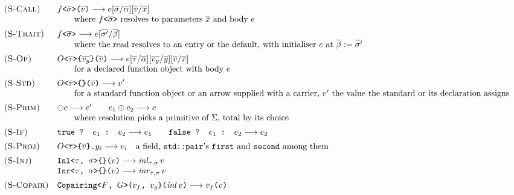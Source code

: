 \begin{figure}[htbp]
\[
\begin{array}{ll}
\textsc{(S-Call)} & f\texttt{<}\overline{\sigma}\texttt{>(}\overline{v}\texttt{)} \longrightarrow e[\overline{\sigma}/\overline{\alpha}][\overline{v}/\overline{x}] \\
 & \qquad \text{where } f\texttt{<}\overline{\sigma}\texttt{>} \text{ resolves to parameters } \overline{x} \text{ and body } e \\[5pt]
\textsc{(S-Trait)} & f\texttt{<}\overline{\sigma}\texttt{>} \longrightarrow e[\overline{\sigma'}/\overline{\beta}] \\
 & \qquad \text{where the read resolves to an entry or the default, with initialiser } e \text{ at } \overline{\beta} := \overline{\sigma'} \\[5pt]
\textsc{(S-Op)} & O\texttt{<}\overline{\tau}\texttt{>\{}\overline{v_y}\texttt{\}(}\overline{v}\texttt{)} \longrightarrow e[\overline{\tau}/\overline{\alpha}][\overline{v_y}/\overline{y}][\overline{v}/\overline{x}] \\
 & \qquad \text{for a declared function object with body } e \\[5pt]
\textsc{(S-Std)} & O\texttt{<}\overline{\tau}\texttt{>\{\}(}\overline{v}\texttt{)} \longrightarrow v' \\
 & \qquad \text{for a standard function object or an arrow supplied with a carrier, } v' \text{ the value the standard or its declaration assigns} \\[5pt]
\textsc{(S-Prim)} & \ominus c \longrightarrow c' \qquad c_1 \oplus c_2 \longrightarrow c \\
 & \qquad \text{where resolution picks a primitive of } \Sigma\text{, total by its choice} \\[5pt]
\textsc{(S-If)} & \texttt{true ? } e_1 \texttt{ : } e_2 \longrightarrow e_1 \qquad \texttt{false ? } e_1 \texttt{ : } e_2 \longrightarrow e_2 \\[5pt]
\textsc{(S-Proj)} & O\texttt{<}\overline{\tau}\texttt{>\{}\overline{v}\texttt{\}.}y_i \longrightarrow v_i \quad \text{a field, \texttt{std::pair}'s \texttt{first} and \texttt{second} among them} \\[5pt]
\textsc{(S-Inj)} & \texttt{Inl<}\tau\texttt{, }\sigma\texttt{>\{\}(}v\texttt{)} \longrightarrow \mathit{inl}_{\tau, \sigma}\,v \\
 & \texttt{Inr<}\tau\texttt{, }\sigma\texttt{>\{\}(}v\texttt{)} \longrightarrow \mathit{inr}_{\tau, \sigma}\,v \\[5pt]
\textsc{(S-Copair)} & \texttt{Copairing<}F\texttt{, }G\texttt{>\{}v_f\texttt{, }v_g\texttt{\}(}\mathit{inl}\,v\texttt{)} \longrightarrow v_f\texttt{(}v\texttt{)} \\

\end{array}\]
\end{figure}
